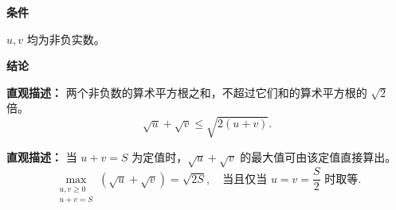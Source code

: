 \begin{statementbox}
	\textbf{\textcolor{CStatement}{条件}}

	\begin{description}[style=nextline, leftmargin=2.8em, labelsep=0.5em, itemsep=0.35em]
		\item[\textbf{\textcolor{CStatement}{条件1（非负实数）：}}]
		      $u,v$ 均为非负实数。
	\end{description}

	\textbf{\textcolor{CStatement}{结论}}

	\begin{description}[style=nextline, leftmargin=2.8em, labelsep=0.5em, itemsep=0.45em]
		\item[\textbf{\textcolor{CStatement}{结论一（根式和不等式）：}}]
		      \textbf{\textcolor{CStatement}{直观描述：}}
		      两个非负数的算术平方根之和，不超过它们和的算术平方根的 $\sqrt{2}$ 倍。
		      \[
			      \sqrt{u}+\sqrt{v}\le\sqrt{2(u+v)}.
		      \]

		\item[\textbf{\textcolor{CStatement}{推广结论（定值最值）：}}]
		      \textbf{\textcolor{CStatement}{直观描述：}}
		      当 $u+v=S$ 为定值时，$\sqrt{u}+\sqrt{v}$ 的最大值可由该定值直接算出。
		      \[
			      \max_{\substack{u,v\ge 0\\u+v=S}}(\sqrt{u}+\sqrt{v})=\sqrt{2S},
			      \quad \text{当且仅当 } u=v=\frac{S}{2} \text{ 时取等}.
		      \]
	\end{description}
\end{statementbox}